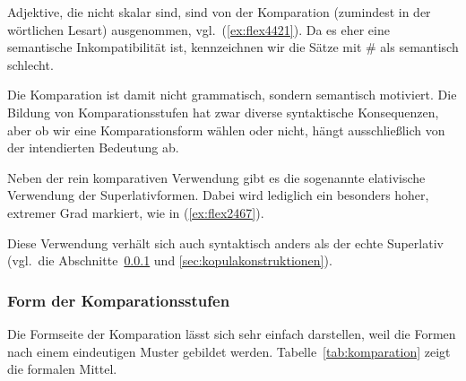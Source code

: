 \begin{exe}
  \ex \label{ex:flex4420}
  \begin{xlist}
  \end{xlist}
\end{exe}

Adjektive, die nicht skalar sind, sind von der Komparation (zumindest in der wörtlichen Lesart) ausgenommen, vgl.\ (\ref{ex:flex4421}).
Da es eher eine semantische Inkompatibilität ist, kennzeichnen wir die Sätze mit \# als semantisch schlecht.

\begin{exe}
  \ex \label{ex:flex4421}
  \begin{xlist}
  \end{xlist}
\end{exe}

Die Komparation ist damit nicht grammatisch, sondern semantisch motiviert.
Die Bildung von Komparationsstufen hat zwar diverse syntaktische Konsequenzen, aber ob wir eine Komparationsform wählen oder nicht, hängt ausschließlich von der intendierten Bedeutung ab.

Neben der rein komparativen Verwendung gibt es die sogenannte elativische Verwendung der Superlativformen.
Dabei wird lediglich ein besonders hoher, extremer Grad markiert, wie in (\ref{ex:flex2467}).

\begin{exe}
\end{exe}

Diese Verwendung verhält sich auch syntaktisch anders als der echte Superlativ (vgl.\ die Abschnitte~\ref{sec:kompform} und \ref{sec:kopulakonstruktionen}).

\subsubsection{Form der Komparationsstufen}

\label{sec:kompform}


Die Formseite der Komparation lässt sich sehr einfach darstellen, weil die Formen nach einem eindeutigen Muster gebildet werden.
Tabelle~\ref{tab:komparation} zeigt die formalen Mittel.

